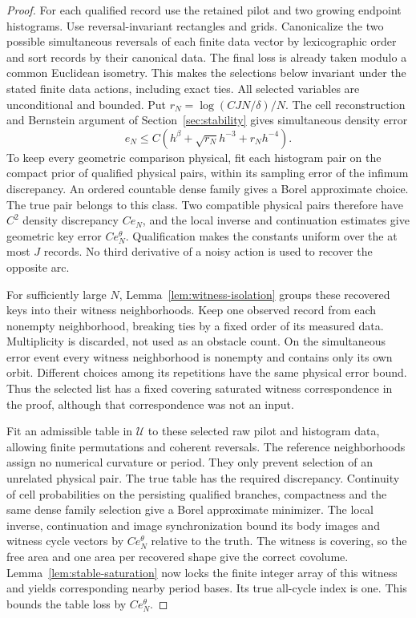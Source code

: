 \begin{proof}
For each qualified record use the retained pilot and two growing endpoint
histograms. Use reversal-invariant rectangles and grids. Canonicalize
the two possible simultaneous reversals of each finite data vector by
lexicographic order and sort records by their canonical data. The final
loss is already taken modulo a common Euclidean isometry. This makes
the selections below invariant under the stated finite data actions,
including exact ties. All selected variables are unconditional and bounded. Put
$r_N=\log(CJN/\delta)/N$. The cell reconstruction and Bernstein
argument of Section~\ref{sec:stability} gives simultaneous density error
\[
             e_N\le C(h^\beta+\sqrt{r_N}h^{-3}+r_Nh^{-4}).
\]
To keep every geometric comparison physical, fit each histogram pair
on the compact prior of qualified physical pairs, within its sampling
error of the infimum discrepancy. An ordered countable dense family
gives a Borel approximate choice. The true pair belongs to this class.
Two compatible physical pairs therefore have $C^2$ density discrepancy
$Ce_N$, and the local inverse and continuation estimates give geometric
key error $Ce_N^\theta$. Qualification makes the constants uniform
over the at most $J$ records. No third derivative of a noisy action is
used to recover the opposite arc.

For sufficiently large $N$, Lemma~\ref{lem:witness-isolation} groups
these recovered keys into their witness neighborhoods. Keep one observed
record from each nonempty neighborhood, breaking ties by a fixed order
of its measured data. Multiplicity is discarded, not used as an obstacle
count. On the simultaneous error event every witness neighborhood is
nonempty and contains only its own orbit. Different choices among its
repetitions have the same physical error bound. Thus the selected list
has a fixed covering saturated witness correspondence in the proof,
although that correspondence was not an input.

Fit an admissible table in $\mathcal U$ to these selected raw pilot and
histogram data, allowing finite permutations and coherent reversals.
The reference neighborhoods assign no numerical curvature or period.
They only prevent selection of an unrelated physical pair. The true
table has the required discrepancy. Continuity of cell probabilities
on the persisting qualified branches, compactness and the same dense
family selection give a Borel approximate minimizer. The local inverse,
continuation and image synchronization bound its body images and witness
cycle vectors by $Ce_N^\theta$ relative to the truth. The witness is
covering, so the free area and one area per recovered shape give the
correct covolume. Lemma~\ref{lem:stable-saturation} now locks the finite
integer array of this witness and yields corresponding nearby period
bases. Its true all-cycle index is one. This bounds the table loss by
$Ce_N^\theta$.


\end{proof}
